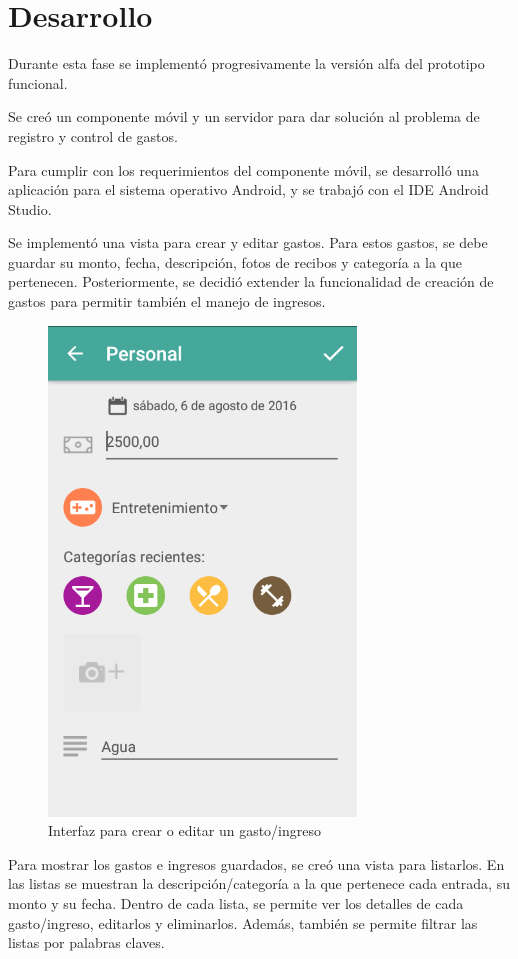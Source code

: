 \section{Desarrollo} \label{sect:desarrollo}

Durante esta fase se implementó progresivamente la versión alfa del prototipo funcional. 

Se creó un componente móvil y un servidor para dar solución al problema de registro y control de gastos.

Para cumplir con los requerimientos del componente móvil, se desarrolló una aplicación para el sistema operativo Android, y se trabajó con el IDE Android Studio.

Se implementó una vista para crear y editar gastos. Para estos gastos, se debe guardar su monto, fecha, descripción, fotos de recibos y categoría a la que pertenecen. Posteriormente, se decidió extender la funcionalidad de creación de gastos para permitir también el manejo de ingresos. 

\begin{figure}[ht]
  \centering
  \includegraphics[scale=0.45,type=png,ext=.png,read=.png]{imagenes/create_entry}
  \caption{Interfaz para crear o editar un gasto/ingreso}
  \label{fig:interfazCrearEntry}
\end{figure}

Para mostrar los gastos e ingresos guardados, se creó una vista para listarlos. En las listas se muestran la descripción/categoría a la que pertenece cada entrada, su monto y su fecha. Dentro de cada lista, se permite ver los detalles de cada gasto/ingreso, editarlos y eliminarlos. Además, también se permite filtrar las listas por palabras claves.

